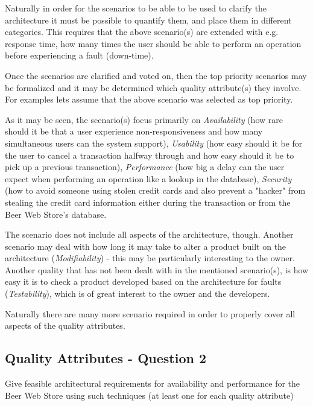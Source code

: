 Naturally in order for the scenarios to be able to be used to clarify the architecture it must be possible to quantify them, and place them in different categories. This requires that the above scenario(s) are extended with e.g. response time, how many times the user should be able to perform an operation before experiencing a fault (down-time). 

Once the scenarios are clarified and voted on, then the top priority scenarios may be formalized and it may be determined which quality attribute(s) they involve. For examples lets assume that the above scenario was selected as top priority.

As it may be seen, the scenario(s) focus primarily on \emph{Availability} (how rare should it be that a user experience non-responsiveness and how many simultaneous users can the system support), \emph{Usability} (how easy should it be for the user to cancel a transaction halfway through and how easy should it be to pick up a previous transaction), \emph{Performance} (how big a delay can the user expect when performing an operation like a lookup in the database), \emph{Security} (how to avoid someone using stolen credit cards and also prevent a "hacker" from stealing the credit card information either during the transaction or from the Beer Web Store's database.

The scenario does not include all aspects of the architecture, though. Another scenario may deal with how long it may take to alter a product built on the architecture (\emph{Modifiability}) - this may be particularly interesting to the owner. Another quality that has not been dealt with in the mentioned scenario(s), is how easy it is to check a product developed based on the architecture for faults (\emph{Testability}), which is of great interest to the owner and the developers.

Naturally there are many more scenario required in order to properly cover all aspects of the quality attributes. 

\subsection{Quality Attributes - Question 2}

\begin{question}
Give feasible architectural requirements for availability
and performance for the Beer Web Store using such techniques (at
least one for each quality attribute)
\end{question}

